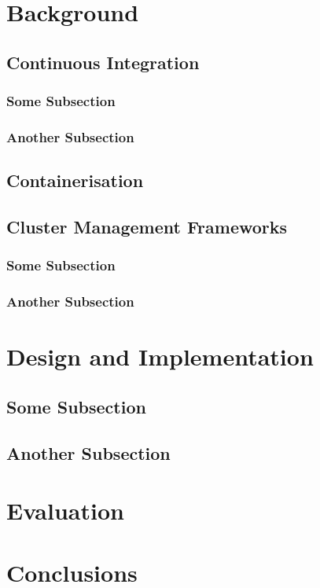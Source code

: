 \documentclass{report}
\begin{document}
\section{Background}
\lipsum[1] 

\subsection{Continuous Integration}
\lipsum[1] 

\subsubsection{Some Subsection}
\lipsum[1] 

\subsubsection{Another Subsection}
\lipsum[1] 

\subsection{Containerisation}
\lipsum[1] 

\subsection{Cluster Management Frameworks}
\lipsum[1] 

\subsubsection{Some Subsection}
\lipsum[1] 

\subsubsection{Another Subsection}
\lipsum[1] 

\section{Design and Implementation}
\lipsum[1] 

\subsection{Some Subsection}
\lipsum[1] 

\subsection{Another Subsection}
\lipsum[1] 

\section{Evaluation}
\lipsum[1-3] 

\section{Conclusions}
\lipsum[1-2] 

\vspace{-7.5mm}
\renewcommand{\refname}{\section{References}}


\end{document}
